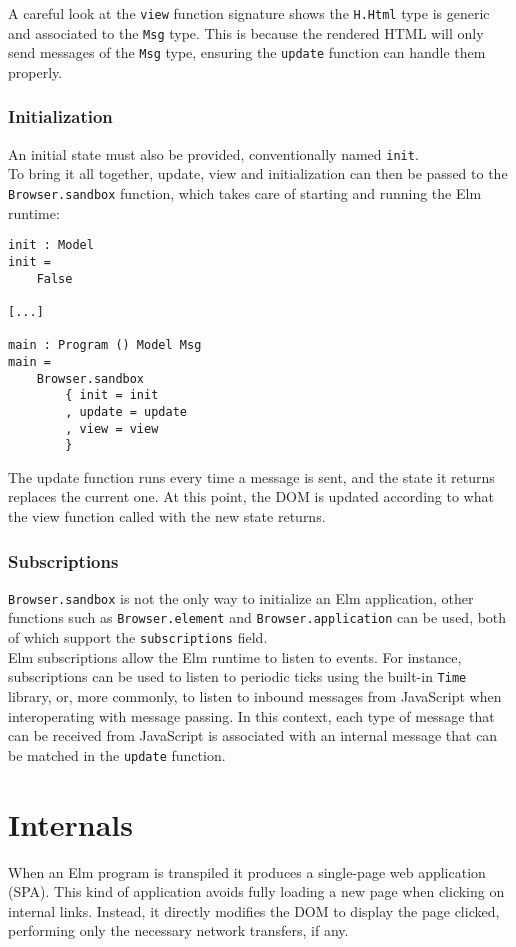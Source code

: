 A careful look at the \texttt{view} function signature shows the \texttt{H.Html} type is generic and associated to the \texttt{Msg} type. This is because the rendered HTML will only send messages of the \texttt{Msg} type, ensuring the \texttt{update} function can handle them properly.

\subsubsection{Initialization}
An initial state must also be provided, conventionally named \texttt{init}.\\
To bring it all together, update, view and initialization can then be passed to the \texttt{Browser.sandbox} function, which takes care of starting and running the Elm runtime:
\begin{verbatim}
init : Model
init =
    False

[...]

main : Program () Model Msg
main =
    Browser.sandbox
        { init = init
        , update = update
        , view = view
        }
\end{verbatim}

The update function runs every time a message is sent, and the state it returns replaces the current one. At this point, the DOM is updated according to what the view function called with the new state returns.

\subsubsection{Subscriptions}

\texttt{Browser.sandbox} is not the only way to initialize an Elm application, other functions such as \texttt{Browser.element} and \texttt{Browser.application} can be used, both of which support the \texttt{subscriptions} field.\\

Elm subscriptions allow the Elm runtime to listen to events. For instance, subscriptions can be used to listen to periodic ticks using the built-in \texttt{Time} library, or, more commonly, to listen to inbound messages from JavaScript when interoperating with message passing. In this context, each type of message that can be received from JavaScript is associated with an internal message that can be matched in the \texttt{update} function.

\section{Internals}
When an Elm program is transpiled it produces a single-page web application (SPA). This kind of application avoids fully loading a new page when clicking on internal links. Instead, it directly modifies the DOM to display the page clicked, performing only the necessary network transfers, if any.\\

